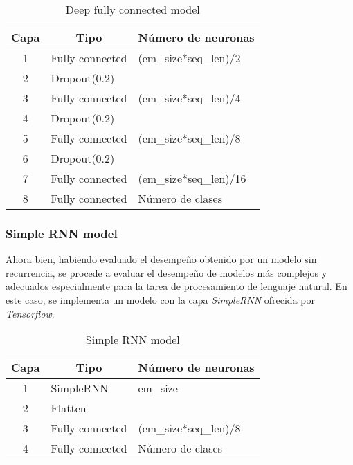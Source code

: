 \begin{table}[H]
\centering
\caption{Deep fully connected model}
\label{tab:deepFC_1}
\begin{tabular}{|c|l|l|}
\hline
\textbf{Capa} & \multicolumn{1}{c|}{\textbf{Tipo}} & \multicolumn{1}{c|}{\textbf{Número de neuronas}} \\ \hline
1             & Fully connected                    & (em\_size*seq\_len)/2                            \\ \hline
2             & Dropout(0.2)                       &                                                  \\ \hline
3             & Fully connected                    & (em\_size*seq\_len)/4                            \\ \hline
4             & Dropout(0.2)                       &                                                  \\ \hline
5             & Fully connected                    & (em\_size*seq\_len)/8                            \\ \hline
6             & Dropout(0.2)                       &                                                  \\ \hline
7             & Fully connected                    & (em\_size*seq\_len)/16                            \\ \hline
8             & Fully connected                    & Número de clases                                 \\ \hline
\end{tabular}
\end{table}

\subsubsection{Simple RNN model}
Ahora bien, habiendo evaluado el desempeño obtenido por un modelo sin recurrencia, se procede a evaluar el desempeño de modelos más complejos y adecuados especialmente para la tarea de procesamiento de lenguaje natural. En este caso, se implementa un modelo con la capa \textit{SimpleRNN} ofrecida por \textit{Tensorflow}.

\begin{table}[H]
\centering
\caption{Simple RNN model}
\label{tab:simpleRNN_1}
\begin{tabular}{|c|l|l|}
\hline
\textbf{Capa} & \multicolumn{1}{c|}{\textbf{Tipo}} & \multicolumn{1}{c|}{\textbf{Número de neuronas}} \\ \hline
1             & SimpleRNN                          & em\_size                                               \\ \hline
2             & Flatten                            &                                                  \\ \hline
3             & Fully connected                    & (em\_size*seq\_len)/8                            \\ \hline
4             & Fully connected                    & Número de clases                                 \\ \hline
\end{tabular}
\end{table}

